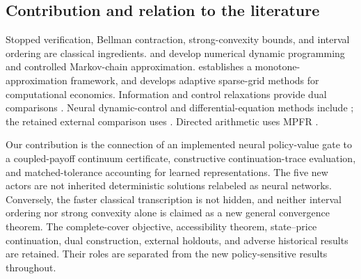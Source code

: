 \subsection{Contribution and relation to the literature}
Stopped verification, Bellman contraction, strong-convexity bounds, and interval ordering are classical ingredients. \citet{Judd1998} and \citet{KushnerDupuis2001} develop numerical dynamic programming and controlled Markov-chain approximation. \citet{BarlesSouganidis1991} establishes a monotone-approximation framework, and \citet{BrummScheidegger2017} develops adaptive sparse-grid methods for computational economics. Information and control relaxations provide dual comparisons \citep{BrownSmithSun2010,BrownSmith2011}. Neural dynamic-control and differential-equation methods include \citet{HanE2016,HanJentzenE2018}; the retained external comparison uses \citet{CaiFangZhou2025}. Directed arithmetic uses MPFR \citep{FousseEtAl2007}.

Our contribution is the connection of an implemented neural policy-value gate to a coupled-payoff continuum certificate, constructive continuation-trace evaluation, and matched-tolerance accounting for learned representations. The five new actors are not inherited deterministic solutions relabeled as neural networks. Conversely, the faster classical transcription is not hidden, and neither interval ordering nor strong convexity alone is claimed as a new general convergence theorem. The complete-cover objective, accessibility theorem, state--price continuation, dual construction, external holdouts, and adverse historical results are retained. Their roles are separated from the new policy-sensitive results throughout.
